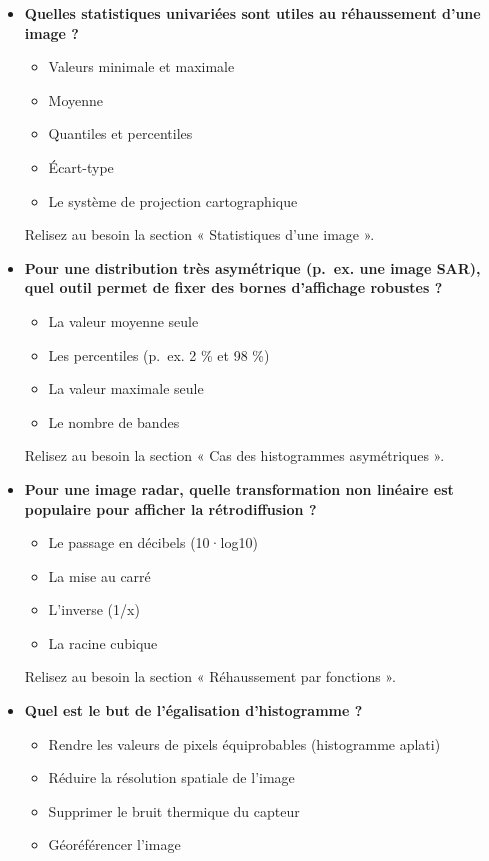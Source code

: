 \documentclass[
  french,
  11pt,
  letterpaper,
  open=any,
  twoside=false,
  french]{scrbook}
\providecommand{\tightlist}{%
  \setlength{\itemsep}{0pt}\setlength{\parskip}{0pt}}
\begin{document}
\begin{itemize}
  Le réhaussement est appliqué dynamiquement à l'affichage; relisez la
  section « Réhaussements visuels ».
\item
  \textbf{Quelles statistiques univariées sont utiles au réhaussement
  d'une image ?}

  \begin{itemize}
  \tightlist
  \item
    Valeurs minimale et maximale
  \item
    Moyenne
  \item
    Quantiles et percentiles
  \item
    Écart-type
  \item
    Le système de projection cartographique
  \end{itemize}

  Relisez au besoin la section « Statistiques d'une image ».
\item
  \textbf{Pour une distribution très asymétrique (p.~ex. une image SAR),
  quel outil permet de fixer des bornes d'affichage robustes ?}

  \begin{itemize}
  \tightlist
  \item
    La valeur moyenne seule
  \item
    Les percentiles (p.~ex. 2 \% et 98 \%)
  \item
    La valeur maximale seule
  \item
    Le nombre de bandes
  \end{itemize}

  Relisez au besoin la section « Cas des histogrammes asymétriques ».
\item
  \textbf{Pour une image radar, quelle transformation non linéaire est
  populaire pour afficher la rétrodiffusion ?}

  \begin{itemize}
  \tightlist
  \item
    Le passage en décibels (10·log10)
  \item
    La mise au carré
  \item
    L'inverse (1/x)
  \item
    La racine cubique
  \end{itemize}

  Relisez au besoin la section « Réhaussement par fonctions ».
\item
  \textbf{Quel est le but de l'égalisation d'histogramme ?}

  \begin{itemize}
  \tightlist
  \item
    Rendre les valeurs de pixels équiprobables (histogramme aplati)
  \item
    Réduire la résolution spatiale de l'image
  \item
    Supprimer le bruit thermique du capteur
  \item
    Géoréférencer l'image
  \end{itemize}


\end{itemize}
\end{document}
